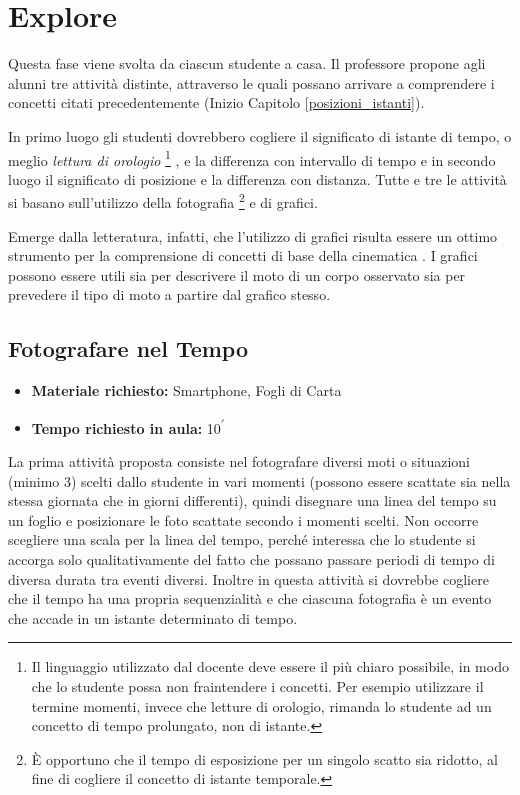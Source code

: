 \documentclass{report} \usepackage[T1]{fontenc} \usepackage[italian]{babel}
\begin{document}
\section{Explore}
Questa fase viene svolta da ciascun studente a casa. Il professore propone agli
alunni tre attività distinte, attraverso le quali possano arrivare a
comprendere i concetti citati precedentemente (Inizio Capitolo \ref{posizioni_istanti}).

In primo luogo gli
studenti dovrebbero cogliere il significato di istante di tempo, o meglio
\emph{lettura di orologio}\cite{arons1997teaching}
\footnote{
           Il linguaggio utilizzato dal docente deve essere il più chiaro possibile, in modo
           che lo studente possa non fraintendere i concetti. Per esempio utilizzare il
           termine momenti, invece che letture di orologio, rimanda lo studente ad un
           concetto di tempo prolungato, non di istante.
         }
, e la differenza con intervallo
di tempo e in secondo luogo il significato di posizione e la differenza con distanza.
Tutte e tre le attività si basano sull’utilizzo della fotografia
\footnote{
          \`E opportuno che il tempo di esposizione per un singolo scatto sia ridotto, al
            fine di cogliere il concetto di istante temporale.
         }
e di grafici.

Emerge dalla letteratura, infatti, che l’utilizzo di grafici risulta essere un
ottimo strumento per la comprensione di concetti di base della cinematica
\cite{beichner1994testing}. I grafici possono essere
utili sia per descrivere il moto di un corpo osservato sia per prevedere il tipo
di moto a partire dal grafico stesso.

\subsection{Fotografare nel Tempo}

\begin{itemize}
\item \textbf{Materiale richiesto:} Smartphone, Fogli di Carta
\item \textbf{Tempo richiesto in aula:} 10\textsuperscript{$\prime$}
\end{itemize}

La prima attività proposta consiste nel fotografare diversi moti o situazioni
(minimo 3) scelti dallo studente in vari momenti (possono essere scattate sia
nella stessa giornata che in giorni differenti), quindi disegnare una linea del
tempo su un foglio e posizionare le foto scattate secondo i momenti scelti. Non
occorre scegliere una scala per la linea del tempo, perché interessa che lo
studente si accorga solo qualitativamente del fatto che possano passare periodi
di tempo di diversa durata tra eventi diversi. Inoltre in questa attività si
dovrebbe cogliere che il tempo ha una propria sequenzialità e che ciascuna
fotografia è un evento che accade in un istante determinato di tempo.
\end{document}

